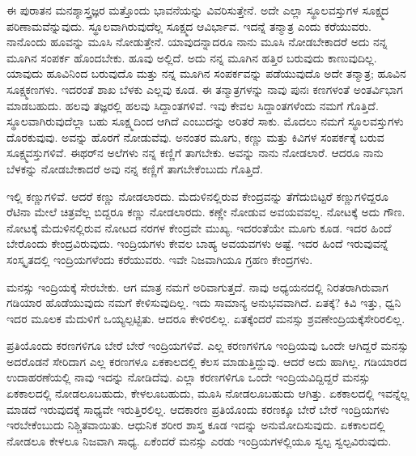\vskip 5pt

ಈ ಪುರಾತನ ಮನಶ್ಶಾಸ್ತ್ರಜ್ಞರ ಮತ್ತೊಂದು ಭಾವನೆಯನ್ನು ವಿವರಿಸುತ್ತೇನೆ. ಅದೇ ಎಲ್ಲಾ ಸ್ಥೂಲವಸ್ತುಗಳ ಸೂಕ್ಷ್ಮದ ಪರಿಣಾಮವೆನ್ನುವುದು. ಸ್ಥೂಲವಾಗಿರುವುದೆಲ್ಲ ಸೂಕ್ಷ್ಮದ ಆವಿರ್ಭಾವ. ಇದನ್ನೆ ತನ್ಮಾತ್ರ ಎಂದು ಕರೆಯುವರು. ನಾನೊಂದು ಹೂವನ್ನು ಮೂಸಿ ನೋಡುತ್ತೇನೆ. ಯಾವುದನ್ನಾದರೂ ನಾನು ಮೂಸಿ ನೋಡಬೇಕಾದರೆ ಅದು ನನ್ನ ಮೂಗಿನ ಸಂಪರ್ಕ ಹೊಂದಬೇಕು. ಹೂವು ಅಲ್ಲಿದೆ. ಅದು ನನ್ನ ಮೂಗಿನ ಹತ್ತಿರ ಬರುವುದು ಕಾಣುವುದಿಲ್ಲ. ಯಾವುದು ಹೂವಿನಿಂದ ಬರುವುದೊ ಮತ್ತು ನನ್ನ ಮೂಗಿನ ಸಂಪರ್ಕವನ್ನು ಪಡೆಯುವುದೊ ಅದೇ ತನ್ಮಾತ್ರ; ಹೂವಿನ ಸೂಕ್ಷ್ಮಕಣಗಳು. ಇದರಂತೆ ಶಾಖ ಬೆಳಕು ಎಲ್ಲವು ಕೂಡ. ಈ ತನ್ಮಾತ್ರಗಳನ್ನು ನಾವು ಪುನಃ ಕಣಗಳಂತೆ ಅಂತರ್ವಿಭಾಗ ಮಾಡಬಹುದು. ಹಲವು ತಜ್ಞರಲ್ಲಿ ಹಲವು ಸಿದ್ದಾಂತಗಳಿವೆ. ಇವು ಕೇವಲ ಸಿದ್ದಾಂತಗಳೆಂದು ನಮಗೆ ಗೊತ್ತಿದೆ. ಸ್ಥೂಲವಾಗಿರುವುದೆಲ್ಲಾ ಬಹು ಸೂಕ್ಷ್ಮದಿಂದ ಆಗಿದೆ ಎಂಬುದನ್ನು ಅರಿತರೆ ಸಾಕು. ಮೊದಲು ನಮಗೆ ಸ್ಥೂಲವಸ್ತುಗಳು ದೊರಕುವುವು. ಅವನ್ನು ಹೊರಗೆ ನೋಡುವೆವು. ಅನಂತರ ಮೂಗು, ಕಣ್ಣು ಮತ್ತು ಕಿವಿಗಳ ಸಂಪರ್ಕಕ್ಕೆ ಬರುವ ಸೂಕ್ಷ್ಮವಸ್ತುಗಳಿವೆ. ಈಥರ್‌ನ ಅಲೆಗಳು ನನ್ನ ಕಣ್ಣಿಗೆ ತಾಗಬೇಕು. ಅವನ್ನು ನಾನು ನೋಡಲಾರೆ. ಆದರೂ ನಾನು ಬೆಳಕನ್ನು ನೋಡಬೇಕಾದರೆ ಅವು ನನ್ನ ಕಣ್ಣಿಗೆ ತಾಗಬೇಕೆಂಬುದು ಗೊತ್ತಿದೆ.

\vskip 6pt

ಇಲ್ಲಿ ಕಣ್ಣುಗಳಿವೆ. ಆದರೆ ಕಣ್ಣು ನೋಡಲಾರದು. ಮೆದುಳಿನಲ್ಲಿರುವ ಕೇಂದ್ರವನ್ನು ತೆಗೆದುಬಿಟ್ಟರೆ ಕಣ್ಣುಗಳಿದ್ದರೂ ರೆಟಿನಾ ಮೇಲೆ ಚಿತ್ರವೆಲ್ಲ ಬಿದ್ದರೂ ಕಣ್ಣು ನೋಡಲಾರದು. ಕಣ್ಣೇ ನೋಡುವ ಅವಯವವಲ್ಲ. ನೋಟಕ್ಕೆ ಅದು ಗೌಣ. ನೋಟಕ್ಕೆ ಮೆದುಳಿನಲ್ಲಿರುವ ನೋಟದ ನರಗಳ ಕೇಂದ್ರವೇ ಮುಖ್ಯ. ಇದರಂತೆಯೇ ಮೂಗು ಕೂಡ. ಇದರ ಹಿಂದೆ ಬೇರೊಂದು ಕೇಂದ್ರವಿರುವುದು. ಇಂದ್ರಿಯಗಳು ಕೇವಲ ಬಾಹ್ಯ ಅವಯವಗಳು ಅಷ್ಟೆ. ಇದರ ಹಿಂದೆ ಇರುವುವನ್ನೆ ಸಂಸ್ಕೃತದಲ್ಲಿ ಇಂದ್ರಿಯಗಳೆಂದು ಕರೆಯುವರು. ಇವೇ ನಿಜವಾಗಿಯೂ ಗ್ರಹಣ ಕೇಂದ್ರಗಳು.

\vskip 6pt

ಮನಸ್ಸು ಇಂದ್ರಿಯಕ್ಕೆ ಸೇರಬೇಕು. ಆಗ ಮಾತ್ರ ನಮಗೆ ಅರಿವಾಗುತ್ತದೆ. ನಾವು ಅಧ್ಯಯನದಲ್ಲಿ ನಿರತರಾಗಿರುವಾಗ ಗಡಿಯಾರ ಹೊಡೆಯುವುದು ನಮಗೆ ಕೇಳಿಸುವುದಿಲ್ಲ. ಇದು ಸಾಮಾನ್ಯ ಅನುಭವವಾಗಿದೆ. ಏತಕ್ಕೆ? ಕಿವಿ ಇತ್ತು, ಧ್ವನಿ ಇದರ ಮೂಲಕ ಮೆದುಳಿಗೆ ಒಯ್ಯಲ್ಪಟ್ಟಿತು. ಆದರೂ ಕೇಳಿರಲಿಲ್ಲ. ಏತಕ್ಕೆಂದರೆ ಮನಸ್ಸು ಶ್ರವಣೇಂದ್ರಿಯಕ್ಕೆ\break ಸೇರಿರಲಿಲ್ಲ.

\vskip 6pt

ಪ್ರತಿಯೊಂದು ಕರಣಗಳಿಗೂ ಬೇರೆ ಬೇರೆ ಇಂದ್ರಿಯಗಳಿವೆ. ಎಲ್ಲ ಕರಣಗಳಿಗೂ ಇಂದ್ರಿಯವು ಒಂದೇ ಆಗಿದ್ದರೆ ಮನಸ್ಸು ಅದರೊಡನೆ ಸೇರಿದಾಗ ಎಲ್ಲ ಕರಣಗಳೂ ಏಕಕಾಲದಲ್ಲಿ ಕೆಲಸ ಮಾಡುತ್ತಿದ್ದುವು. ಆದರೆ ಅದು ಹಾಗಿಲ್ಲ. ಗಡಿಯಾರದ ಉದಾಹರಣೆಯಲ್ಲಿ ನಾವು ಇದನ್ನು ನೋಡಿದೆವು. ಎಲ್ಲಾ ಕರಣಗಳಿಗೂ ಒಂದೇ ಇಂದ್ರಿಯವಿದ್ದಿದ್ದರೆ ಮನಸ್ಸು ಏಕಕಾಲದಲ್ಲಿ ನೋಡಲೂಬಹುದು, ಕೇಳಲೂಬಹುದು, ಮೂಸಿ ನೋಡಲೂಬಹುದು ಆಗಿತ್ತು. ಏಕಕಾಲದಲ್ಲಿ ಇವನ್ನೆಲ್ಲ ಮಾಡದೆ ಇರುವುದಕ್ಕೆ ಸಾಧ್ಯವೇ ಇರುತ್ತಿರಲಿಲ್ಲ. ಆದಕಾರಣ ಪ್ರತಿಯೊಂದು ಕರಣಕ್ಕೂ ಬೇರೆ ಬೇರೆ ಇಂದ್ರಿಯಗಳು ಇರಬೇಕೆಂಬುದು ನಿಶ್ಚಿತವಾಯಿತು. ಆಧುನಿಕ ಶರೀರ ಶಾಸ್ತ್ರ ಕೂಡ ಇದನ್ನು ಅನುಮೋದಿಸುವುದು. ಏಕಕಾಲದಲ್ಲಿ ನೋಡಲೂ ಕೇಳಲೂ ನಿಜವಾಗಿ ಸಾಧ್ಯ. ಏಕೆಂದರೆ ಮನಸ್ಸು ಎರಡು ಇಂದ್ರಿಯಗಳಲ್ಲಿಯೂ ಸ್ವಲ್ಪ ಸ್ವಲ್ಪವಿರುವುದು.

\vskip 10pt

